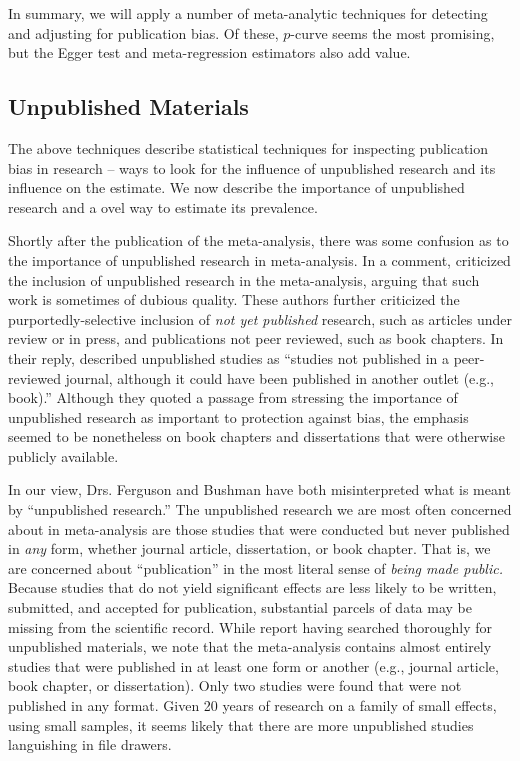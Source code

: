 \documentclass[man]{apa6}
\begin{document}
In summary, we will apply a number of meta-analytic techniques for detecting and adjusting for publication bias. Of these, $p$-curve seems the most promising, but the Egger test and meta-regression estimators also add value.

\subsection{Unpublished Materials}
The above techniques describe statistical techniques for inspecting publication bias in research -- ways to look for the influence of unpublished research and its influence on the estimate. We now describe the importance of unpublished research and a ovel way to estimate its prevalence.

Shortly after the publication of the \citet{Anderson:etal:2010} meta-analysis, there was some confusion as to the importance of unpublished research in meta-analysis. In a comment, \citet{Ferguson:Kilburn:2010} %
criticized the inclusion of unpublished research in the meta-analysis, arguing that such work is sometimes of dubious quality. These authors further criticized the purportedly-selective inclusion of {\em not yet published} research, such as articles under review or in press, and publications not peer reviewed, such as book chapters. In their reply, \citet{Bushman:etal:2010} described unpublished studies as ``studies not published in a peer-reviewed journal, although it could have been published in another outlet (e.g., book).'' Although they quoted a passage from \citet{Cooper:2009} stressing the importance of unpublished research as important to protection against bias, the emphasis seemed to be nonetheless on book chapters and dissertations that were otherwise publicly available.

In our view, Drs. Ferguson and Bushman have both misinterpreted what is meant by ``unpublished research.'' The unpublished research we are most often concerned about in meta-analysis are those studies that were conducted but never published in {\em any} form, whether journal article, dissertation, or book chapter. That is, we are concerned about ``publication'' in the most literal sense of {\em being made public.}  Because studies that do not yield significant effects are less likely to be written, submitted, and accepted for publication, substantial parcels of data may be missing from the scientific record. While \citet{Anderson:etal:2010} report having searched thoroughly for unpublished materials, we note that the meta-analysis contains almost entirely studies that were published in at least one form or another (e.g., journal article, book chapter, or dissertation). Only two studies were found that were not published in any format. Given 20 years of research on a family of small effects, using small samples, it seems likely that there are more unpublished studies languishing in file drawers.
\end{document}
